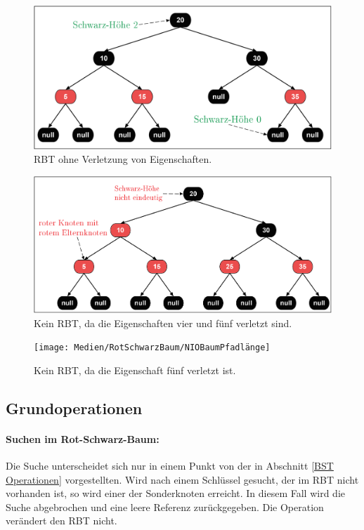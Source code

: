 \documentclass[a4paper,12pt]{article}
\begin{document}
\begin{figure}[H]
	\centering
	\includegraphics[width= 1\textwidth]{Medien/RotSchwarzBaum/IOBaum}
	\caption{RBT ohne Verletzung von Eigenschaften. }
	\label{fig:IOBaum}
\end{figure}
\begin{figure}[H]
	\centering
	\includegraphics[width= 1\textwidth]{Medien/RotSchwarzBaum/NIOBaumZweiRote}
	\caption{Kein RBT, da die Eigenschaften vier und fünf verletzt sind. }
	\label{fig:NIOBaumZweiRote}
\end{figure}
\begin{figure}[H]
	\centering
	\texttt{[image: Medien/RotSchwarzBaum/NIOBaumPfadlänge]}
	\caption{Kein RBT, da die Eigenschaft fünf verletzt ist.  }
	\label{fig:NIOBaumPfadlänge}
\end{figure}
\subsection{Grundoperationen}
\paragraph{Suchen im Rot-Schwarz-Baum:}
Die Suche unterscheidet sich nur in einem Punkt von der in Abschnitt \ref{BST Operationen} vorgestellten. Wird nach einem Schlüssel gesucht, der im RBT nicht vorhanden ist, so wird einer der Sonderknoten erreicht. In diesem Fall wird die Suche abgebrochen und eine leere Referenz zurückgegeben. Die Operation verändert den RBT nicht. 
\end{document}

